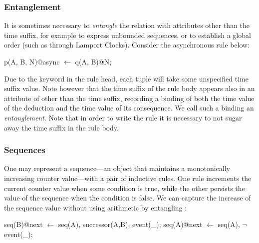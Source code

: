 
\subsubsection{Entanglement}
\label{sec:entangle}

It is sometimes necessary to {\em entangle} the  relation
with attributes other than the time suffix, for example to express unbounded
sequences, or to establish a global order (such as through Lamport Clocks).
Consider the asynchronous rule below:

\begin{Dedalus}
p(A, B, N)@async \(\leftarrow\)
  q(A, B)@N;
\end{Dedalus}
\noindent

Due to the  keyword in the rule head, each  tuple
will take some unspecified time suffix value.  Note however that the time
suffix  of the rule body appears also in an attribute of 
other than the time suffix, recording a binding of both the time value of the
deduction and the time value of its consequence.  We call such a binding an
{\em entanglement}.   Note that in order to write the rule it is necessary to
not sugar away the time suffix in the rule body.  


\subsubsection{Sequences}

One may represent a sequence---an object that maintains a monotonically
increasing counter value---with a pair of inductive rules.  One rule
increments the current counter value when some condition is true, while the
other persists the value of the sequence when the condition is false.  We can
capture the increase of the sequence value without using arithmetic by
entangling :

\begin{Dedalus}
seq(B)@next \(\leftarrow\) seq(A), successor(A,B), event(_);  
seq(A)@next \(\leftarrow\) seq(A), \(\lnot\)event(_);
\end{Dedalus}

